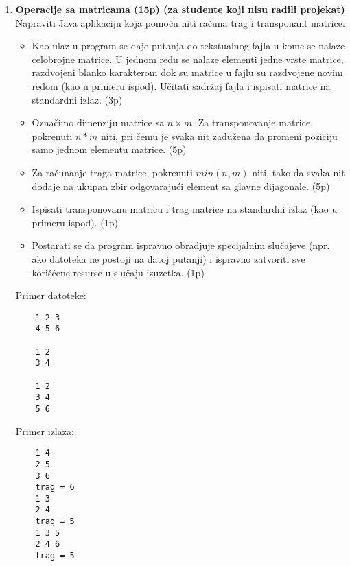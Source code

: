 \documentclass[]{article}
\begin{document}
\begin{enumerate}

\item \textbf{Operacije sa matricama (15p) (za studente koji nisu radili projekat)}
  \\Napraviti Java aplikaciju koja pomoću niti računa trag i transponant matrice.
  \begin{itemize}
    \item Kao ulaz u program se daje putanja do tekstualnog fajla u kome se nalaze celobrojne matrice. U jednom redu se nalaze elementi jedne vrste matrice, razdvojeni blanko karakterom dok su matrice u fajlu su razdvojene novim redom (kao u primeru ispod). Učitati sadržaj fajla i ispisati matrice na standardni izlaz. \hfill (3p)
    \item Označimo dimenziju matrice sa $n \times m$. Za transponovanje matrice, pokrenuti $n*m$ niti, pri čemu je svaka nit zadužena da promeni poziciju samo jednom elementu matrice. \hfill (5p)
    \item Za računanje traga matrice, pokrenuti $min(n, m)$ niti, tako da svaka nit dodaje na ukupan zbir odgovarajući element sa glavne dijagonale. \hfill (5p)
    \item Ispisati transponovanu matricu i trag matrice na standardni izlaz (kao u primeru ispod). \hfill (1p)
    \item Postarati se da program ispravno obradjuje specijalnim slu\v{c}ajeve (npr. ako datoteka ne postoji na datoj putanji) i ispravno zatvoriti sve kori\v{s}\'c{}ene resurse u slu\v{c}aju izuzetka. \hfill (1p)
  \end{itemize}
    
  \vspace{10pt}
  Primer datoteke:
  \begin{lstlisting}
    1 2 3
    4 5 6

    1 2
    3 4

    1 2
    3 4
    5 6
  \end{lstlisting}

  Primer izlaza:
  \begin{lstlisting}
    1 4
    2 5
    3 6
    trag = 6
    1 3
    2 4
    trag = 5
    1 3 5
    2 4 6
    trag = 5
  \end{lstlisting}


\end{enumerate}
\end{document}
